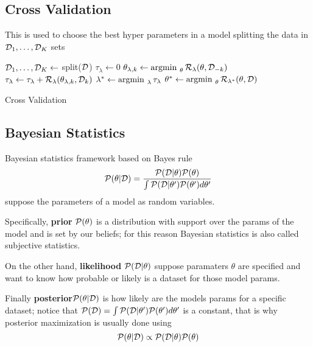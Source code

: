 \documentclass[../../main.tex]{subfiles}
\begin{document}
\subsection{Cross Validation}
This is used to choose the best hyper parameters in a model splitting the data in $\mathcal{D}_1,\dots,\mathcal{D}_K$ sets
\begin{algorithm}[H]
\begin{algorithmic}
\State $\mathcal{D}_1,\dots,\mathcal{D}_K \leftarrow$ split($\mathcal{D}$)
\For{$\lambda \in \Lambda$}
    \State $\tau_\lambda \leftarrow 0$
        \State $\theta_{\lambda,k} \leftarrow \operatorname*{argmin\text{ }}_\theta \mathcal{R}_\lambda(\theta,\mathcal{D}_{-k})$
        \State $\tau_\lambda \leftarrow \tau_\lambda + \mathcal{R}_\lambda(\theta_{\lambda,k},\mathcal{D}_k)$
    \EndFor
\EndFor
\State $\lambda^* \leftarrow \operatorname*{argmin\text{ }}_\lambda \tau_\lambda$
\State $\theta^* \leftarrow \operatorname*{argmin\text{ }}_\theta \mathcal{R}_{\lambda^*}(\theta,\mathcal{D}) $
\end{algorithmic}
\caption{Cross Validation}
\end{algorithm}

\subsection{Bayesian Statistics}
Bayesian statistics framework based on Bayes rule
\begin{equation*}
    \mathcal{P}(\theta|\mathcal{D}) = \dfrac{\mathcal{P}(\mathcal{D}|\theta)\mathcal{P}(\theta)}{\int \mathcal{P}(\mathcal{D}|\theta')\mathcal{P}(\theta')d\theta'}
\end{equation*}
suppose the parameters of a model as random variables.

Specifically, \textbf{prior} $\mathcal{P}(\theta)$ is a distribution with support over the params of the model and is set by our beliefs; for this reason Bayesian statistics is also called subjective statistics.

On the other hand, \textbf{likelihood} $\mathcal{P}(\mathcal{D}|\theta)$ suppose paramaters $\theta$ are specified and want to know how probable or likely is a dataset for those model params.

Finally \textbf{posterior}$\mathcal{P}(\theta|\mathcal{D})$ is how likely are the models params for a specific dataset; notice that $\mathcal{P}(\mathcal{D}) = \int \mathcal{P}(\mathcal{D}|\theta')\mathcal{P}(\theta')d\theta'$ is a constant, that is why posterior maximization is usually done using 
\begin{equation*}
    \mathcal{P}(\theta|\mathcal{D}) \propto \mathcal{P}(\mathcal{D}|\theta)\mathcal{P}(\theta)
\end{equation*}
\end{document}
